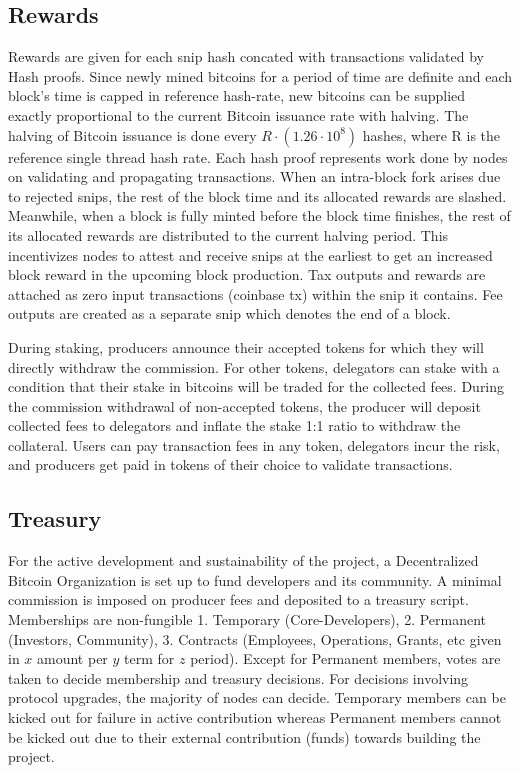 \documentclass[a4paper, 10pt]{extarticle}
\begin{document}
\subsection{Rewards}
Rewards are given for each snip hash concated with transactions validated by Hash proofs. Since newly mined bitcoins for a period of time are definite and each block's time is capped in reference hash-rate, new bitcoins can be supplied exactly proportional to the current Bitcoin issuance rate with halving. The halving of Bitcoin issuance is done every $R \cdot (1.26 \cdot 10^8)$ hashes, where R is the reference single thread hash rate. Each hash proof represents work done by nodes on validating and propagating transactions. When an intra-block fork arises due to rejected snips, the rest of the block time and its allocated rewards are slashed. Meanwhile, when a block is fully minted before the block time finishes, the rest of its allocated rewards are distributed to the current halving period. This incentivizes nodes to attest and receive snips at the earliest to get an increased block reward in the upcoming block production. Tax outputs and rewards are attached as zero input transactions (coinbase tx) within the snip it contains. Fee outputs are created as a separate snip which denotes the end of a block.

During staking, producers announce their accepted tokens for which they will directly withdraw the commission. For other tokens, delegators can stake with a condition that their stake in bitcoins will be traded for the collected fees. During the commission withdrawal of non-accepted tokens, the producer will deposit collected fees to delegators and inflate the stake 1:1 ratio to withdraw the collateral. Users can pay transaction fees in any token, delegators incur the risk, and producers get paid in tokens of their choice to validate transactions.
\subsection{Treasury}
For the active development and sustainability of the project, a Decentralized Bitcoin Organization is set up to fund developers and its community. A minimal commission is imposed on producer fees and deposited to a treasury script. Memberships are non-fungible 1. Temporary (Core-Developers), 2. Permanent (Investors, Community), 3. Contracts (Employees, Operations, Grants, etc given in $x$ amount per $y$ term for $z$ period). Except for Permanent members, votes are taken to decide membership and treasury decisions. For decisions involving protocol upgrades, the majority of nodes can decide. Temporary members can be kicked out for failure in active contribution whereas Permanent members cannot be kicked out due to their external contribution (funds) towards building the project.
\end{document}
